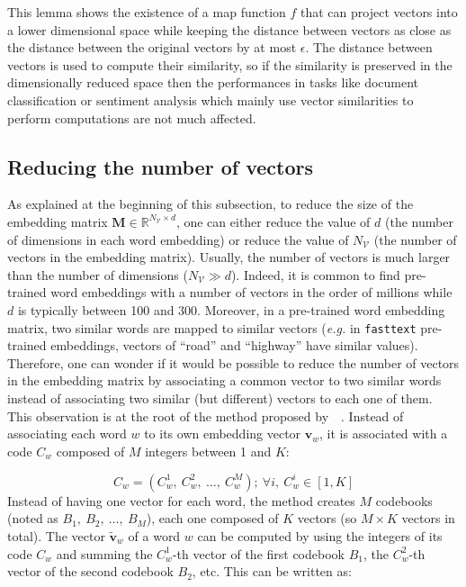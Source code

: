     \noindent This lemma shows the existence of a map function $f$ that can
    project vectors into a lower dimensional space while keeping the distance
    between vectors as close as the distance between the original vectors by at
    most $\epsilon$. The distance between vectors is used to compute their
    similarity, so if the similarity is preserved in the dimensionally reduced
    space then the performances in tasks like document classification or
    sentiment analysis which mainly use vector similarities to perform
    computations are not much affected.

  \subsection{Reducing the number of vectors}
    \label{ch04:subsec:reduce-words}
    As explained at the beginning of this subsection, to reduce the size of the
    embedding matrix $\mathbf{M} \in \mathbb{R}^{N_\mathcal{V} \times d}$, one
    can either reduce the value of $d$ (the number of dimensions in each word
    embedding) or reduce the value of $N_\mathcal{V}$ (the number of vectors in
    the embedding matrix). Usually, the number of vectors is much larger than
    the number of dimensions ($N_\mathcal{V} \gg d$). Indeed, it is common to
    find pre-trained word embeddings with a number of vectors in the order of
    millions while $d$ is typically between 100 and 300. Moreover, in a
    pre-trained word embedding matrix, two similar words are mapped to similar
    vectors (\textit{e.g.} in \texttt{fasttext} pre-trained embeddings, vectors
    of ``road'' and ``highway'' have similar values). Therefore, one can wonder
    if it would be possible to reduce the number of vectors in the embedding
    matrix by associating a common vector to two similar words instead of
    associating two similar (but different) vectors to each one of them. This
    observation is at the root of the method proposed
    by~\citeauthor{shu2018compressing}~\citep{shu2018compressing}. Instead of
    associating each word $w$ to its own embedding vector $\mathbf{v}_w$, it is
    associated with a code $C_w$ composed of $M$ integers between 1 and $K$:

    \begin{equation}
      C_w = (C^1_w,~C^2_w,~\dots,~C^M_w); ~\forall i, ~ C^i_w \in [1, K]
    \end{equation}
    Instead of having one vector for each word, the method creates $M$ codebooks
    (noted as $B_1,~B_2,~\dots,~B_M$), each one composed of $K$ vectors (so $M
    \times K$ vectors in total). The vector $\widetilde{\mathbf{v}}_w$ of a word
    $w$ can be computed by using the integers of its code $C_w$ and summing the
    $C^1_w$-th vector of the first codebook $B_1$, the $C^2_w$-th vector of the
    second codebook $B_2$, etc. This can be written as:

